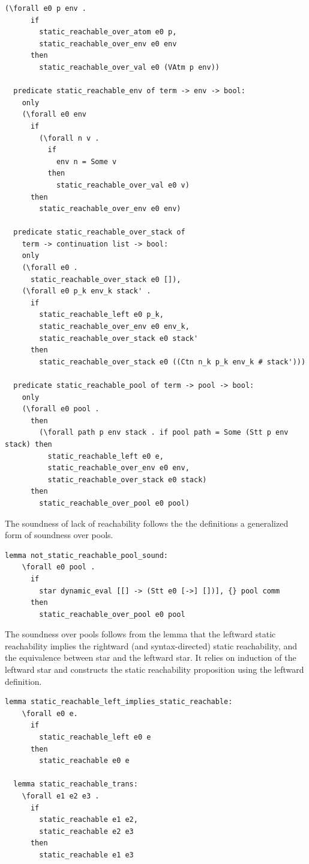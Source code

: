 \documentclass[10pt]{article}
\begin{document}
\begin{lstlisting}[language=logic, mathescape]
    (\forall e0 p env .
      if
        static_reachable_over_atom e0 p, 
        static_reachable_over_env e0 env
      then
        static_reachable_over_val e0 (VAtm p env))

  predicate static_reachable_env of term -> env -> bool:
    only
    (\forall e0 env
      if
        (\forall n v .
          if
            env n = Some v
          then
            static_reachable_over_val e0 v)
      then
        static_reachable_over_env e0 env)

  predicate static_reachable_over_stack of
    term -> continuation list -> bool:
    only
    (\forall e0 .
      static_reachable_over_stack e0 []),
    (\forall e0 p_k env_k stack' .
      if
        static_reachable_left e0 p_k, 
        static_reachable_over_env e0 env_k,
        static_reachable_over_stack e0 stack' 
      then
        static_reachable_over_stack e0 ((Ctn n_k p_k env_k # stack')))

  predicate static_reachable_pool of term -> pool -> bool:
    only
    (\forall e0 pool .
      then
        (\forall path p env stack . if pool path = Some (Stt p env stack) then 
          static_reachable_left e0 e, 
          static_reachable_over_env e0 env, 
          static_reachable_over_stack e0 stack)
      then
        static_reachable_over_pool e0 pool)

  \end{lstlisting}

The soundness of lack of reachability follows the the definitions
a generalized form of soundness over pools.

\begin{lstlisting}[language=logic, mathescape]
  lemma not_static_reachable_pool_sound:
    \forall e0 pool .
      if
        star dynamic_eval [[] -> (Stt e0 [->] [])], {} pool comm 
      then
        static_reachable_over_pool e0 pool

  \end{lstlisting}


The soundness over pools follows from the lemma that the leftward
static reachability implies the rightward (and syntax-directed) static reachability,
and the equivalence between star and the leftward star.  It relies on induction of the
leftward star and constructs the static reachability
proposition using the leftward definition.  

\begin{lstlisting}[language=logic, mathescape]
  lemma static_reachable_left_implies_static_reachable:
    \forall e0 e. 
      if
        static_reachable_left e0 e
      then
        static_reachable e0 e

  lemma static_reachable_trans:
    \forall e1 e2 e3 .
      if 
        static_reachable e1 e2,
        static_reachable e2 e3
      then
        static_reachable e1 e3
  \end{lstlisting}
\end{document}
